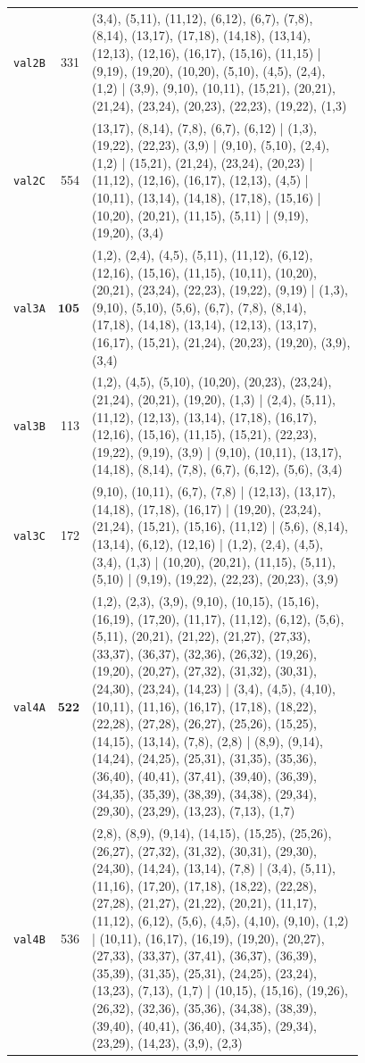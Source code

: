 \begin{landscape}
\begin{longtable}{lr>{\tiny\raggedright\arraybackslash}p{0.78\linewidth}}
\texttt{val2B} & 331 & (3,4), (5,11), (11,12), (6,12), (6,7), (7,8), (8,14), (13,17), (17,18), (14,18), (13,14), (12,13), (12,16), (16,17), (15,16), (11,15) | (9,19), (19,20), (10,20), (5,10), (4,5), (2,4), (1,2) | (3,9), (9,10), (10,11), (15,21), (20,21), (21,24), (23,24), (20,23), (22,23), (19,22), (1,3) \\[2pt]
\texttt{val2C} & 554 & (13,17), (8,14), (7,8), (6,7), (6,12) | (1,3), (19,22), (22,23), (3,9) | (9,10), (5,10), (2,4), (1,2) | (15,21), (21,24), (23,24), (20,23) | (11,12), (12,16), (16,17), (12,13), (4,5) | (10,11), (13,14), (14,18), (17,18), (15,16) | (10,20), (20,21), (11,15), (5,11) | (9,19), (19,20), (3,4) \\[2pt]
\texttt{val3A} & $\mathbf{105}$ & (1,2), (2,4), (4,5), (5,11), (11,12), (6,12), (12,16), (15,16), (11,15), (10,11), (10,20), (20,21), (23,24), (22,23), (19,22), (9,19) | (1,3), (9,10), (5,10), (5,6), (6,7), (7,8), (8,14), (17,18), (14,18), (13,14), (12,13), (13,17), (16,17), (15,21), (21,24), (20,23), (19,20), (3,9), (3,4) \\[2pt]
\texttt{val3B} & 113 & (1,2), (4,5), (5,10), (10,20), (20,23), (23,24), (21,24), (20,21), (19,20), (1,3) | (2,4), (5,11), (11,12), (12,13), (13,14), (17,18), (16,17), (12,16), (15,16), (11,15), (15,21), (22,23), (19,22), (9,19), (3,9) | (9,10), (10,11), (13,17), (14,18), (8,14), (7,8), (6,7), (6,12), (5,6), (3,4) \\[2pt]
\texttt{val3C} & 172 & (9,10), (10,11), (6,7), (7,8) | (12,13), (13,17), (14,18), (17,18), (16,17) | (19,20), (23,24), (21,24), (15,21), (15,16), (11,12) | (5,6), (8,14), (13,14), (6,12), (12,16) | (1,2), (2,4), (4,5), (3,4), (1,3) | (10,20), (20,21), (11,15), (5,11), (5,10) | (9,19), (19,22), (22,23), (20,23), (3,9) \\[2pt]
\texttt{val4A} & $\mathbf{522}$ & (1,2), (2,3), (3,9), (9,10), (10,15), (15,16), (16,19), (17,20), (11,17), (11,12), (6,12), (5,6), (5,11), (20,21), (21,22), (21,27), (27,33), (33,37), (36,37), (32,36), (26,32), (19,26), (19,20), (20,27), (27,32), (31,32), (30,31), (24,30), (23,24), (14,23) | (3,4), (4,5), (4,10), (10,11), (11,16), (16,17), (17,18), (18,22), (22,28), (27,28), (26,27), (25,26), (15,25), (14,15), (13,14), (7,8), (2,8) | (8,9), (9,14), (14,24), (24,25), (25,31), (31,35), (35,36), (36,40), (40,41), (37,41), (39,40), (36,39), (34,35), (35,39), (38,39), (34,38), (29,34), (29,30), (23,29), (13,23), (7,13), (1,7) \\[2pt]
\texttt{val4B} & 536 & (2,8), (8,9), (9,14), (14,15), (15,25), (25,26), (26,27), (27,32), (31,32), (30,31), (29,30), (24,30), (14,24), (13,14), (7,8) | (3,4), (5,11), (11,16), (17,20), (17,18), (18,22), (22,28), (27,28), (21,27), (21,22), (20,21), (11,17), (11,12), (6,12), (5,6), (4,5), (4,10), (9,10), (1,2) | (10,11), (16,17), (16,19), (19,20), (20,27), (27,33), (33,37), (37,41), (36,37), (36,39), (35,39), (31,35), (25,31), (24,25), (23,24), (13,23), (7,13), (1,7) | (10,15), (15,16), (19,26), (26,32), (32,36), (35,36), (34,38), (38,39), (39,40), (40,41), (36,40), (34,35), (29,34), (23,29), (14,23), (3,9), (2,3) \\[2pt]

\end{longtable}
\end{landscape}
